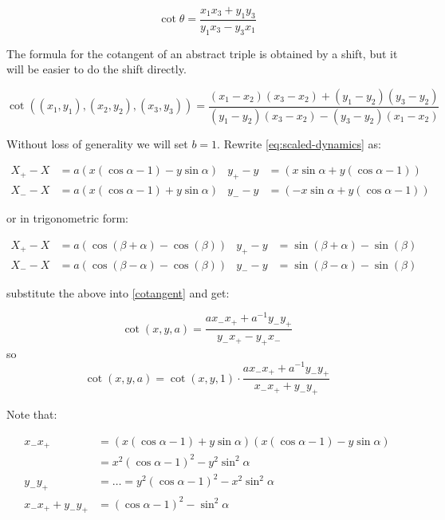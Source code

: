 \begin{equation} \label{cotangent}
\cot\theta = \frac{x_1 x_3 + y_1 y_3}{y_1 x_3 - y_3 x_1} 
\end{equation}

The formula for the cotangent of an abstract triple is obtained by a shift,
but it will be easier to do the shift directly.

\begin{equation*} 
\cot((x_1,y_1),(x_2,y_2),(x_3,y_3)) = 
\frac{(x_1-x_2) (x_3-x_2) + (y_1-y_2) (y_3-y_2)}{(y_1-y_2) (x_3-x_2) - (y_3-y_2) (x_1-x_2)}
\end{equation*}

Without loss of generality we will set $b=1$. Rewrite \cref{eq:scaled-dynamics} as: 

\begin{align*}
X_+ - X &= a (x (\cos \alpha - 1) - y \sin \alpha)& y_+ - y &= ( x \sin \alpha + y (\cos \alpha - 1))  \\
X_- - X &= a (x (\cos \alpha - 1) + y \sin \alpha) & y_- - y &= (-x \sin \alpha + y (\cos \alpha - 1))  
\end{align*}

\noindent or in trigonometric form:

\begin{align*}
X_+ - X &= a (\cos(\beta+\alpha)-\cos(\beta))    &     y_+ - y &= \sin(\beta+\alpha)-\sin(\beta)  \\
X_- - X &= a (\cos(\beta-\alpha)-\cos(\beta))    &     y_- - y &= \sin(\beta-\alpha)-\sin(\beta)  
\end{align*}

\noindent substitute the above into 
\cref{cotangent} and get:

\begin{equation*} \label{cot-a}
\cot(x,y,a) = \frac{a x_- x_+ + a^{-1} y_- y_+}{y_- x_+ - y_+ x_-}
\end{equation*}
so
\begin{equation*}
\cot(x,y,a) = \cot(x,y,1) \cdot \frac{a x_- x_+ + a^{-1} y_- y_+}{x_- x_+ + y_- y_+}
\end{equation*}

\noindent Note that:

\begin{align*}
x_- x_+ &= (x (\cos \alpha - 1) + y \sin \alpha) (x (\cos \alpha - 1) - y \sin \alpha) \\&= x^2 (\cos \alpha - 1)^2 - y^2 \sin^2 \alpha \\
y_- y_+ &= \dots                                                   = y^2 (\cos \alpha - 1)^2 - x^2 \sin^2 \alpha \\
x_- x_+ + y_- y_+                                                 &= (\cos \alpha - 1)^2 - \sin^2 \alpha 
\end{align*}

